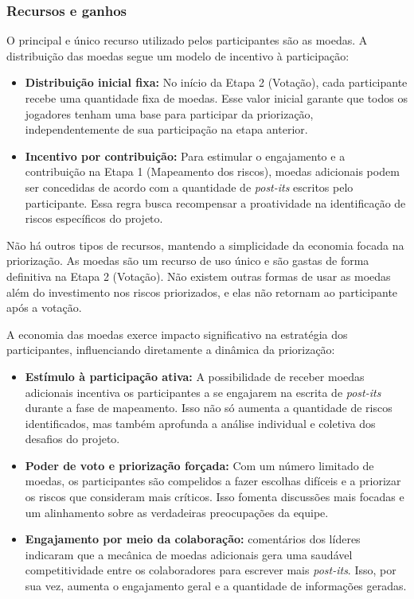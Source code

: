 \documentclass[
	12pt,
	openright,
	twoside,
	a4paper,
	english,
	brazil
	]{abntex2}
\begin{document}
\subsubsection{Recursos e ganhos}
O principal e único recurso utilizado pelos participantes são as moedas. A distribuição das moedas segue um modelo de incentivo à participação:
\begin{itemize}
\item \textbf{Distribuição inicial fixa:} No início da Etapa 2 (Votação), cada participante recebe uma quantidade fixa de moedas. Esse valor inicial garante que todos os jogadores tenham uma base para participar da priorização, independentemente de sua participação na etapa anterior.
\item \textbf{Incentivo por contribuição:} Para estimular o engajamento e a contribuição na Etapa 1 (Mapeamento dos riscos), moedas adicionais podem ser concedidas de acordo com a quantidade de \textit{post-its} escritos pelo participante. Essa regra busca recompensar a proatividade na identificação de riscos específicos do projeto.
\end{itemize}
Não há outros tipos de recursos, mantendo a simplicidade da economia focada na priorização. As moedas são um recurso de uso único e são gastas de forma definitiva na Etapa 2 (Votação). Não existem outras formas de usar as moedas além do investimento nos riscos priorizados, e elas não retornam ao participante após a votação.

A economia das moedas exerce impacto significativo na estratégia dos participantes, influenciando diretamente a dinâmica da priorização:
\begin{itemize}
\item \textbf{Estímulo à participação ativa:} A possibilidade de receber moedas adicionais incentiva os participantes a se engajarem na escrita de \textit{post-its} durante a fase de mapeamento. Isso não só aumenta a quantidade de riscos identificados, mas também aprofunda a análise individual e coletiva dos desafios do projeto.
\item \textbf{Poder de voto e priorização forçada:} Com um número limitado de moedas, os participantes são compelidos a fazer escolhas difíceis e a priorizar os riscos que consideram mais críticos. Isso fomenta discussões mais focadas e um alinhamento sobre as verdadeiras preocupações da equipe.
\item \textbf{Engajamento por meio da colaboração:} comentários dos líderes indicaram que a mecânica de moedas adicionais gera uma saudável competitividade entre os colaboradores para escrever mais \textit{post-its}. Isso, por sua vez, aumenta o engajamento geral e a quantidade de informações geradas.
\end{itemize}
\end{document}
